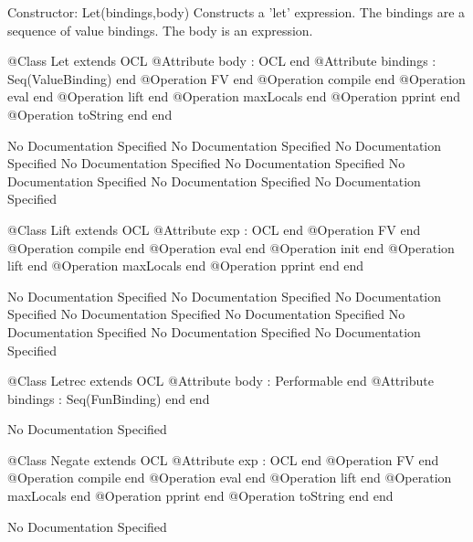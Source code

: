       Constructor: Let(bindings,body)
        Constructs a 'let' expression. The bindings are a sequence of value bindings.
        The body is an expression.
\begin{Interface}
@Class Let extends OCL
  @Attribute body : OCL end
  @Attribute bindings : Seq(ValueBinding) end
  @Operation FV end
  @Operation compile end
  @Operation eval end
  @Operation lift end
  @Operation maxLocals end
  @Operation pprint end
  @Operation toString end
end
\end{Interface}
No Documentation Specified
No Documentation Specified
No Documentation Specified
No Documentation Specified
No Documentation Specified
No Documentation Specified
No Documentation Specified
No Documentation Specified
\begin{Interface}
@Class Lift extends OCL
  @Attribute exp : OCL end
  @Operation FV end
  @Operation compile end
  @Operation eval end
  @Operation init end
  @Operation lift end
  @Operation maxLocals end
  @Operation pprint end
end
\end{Interface}
No Documentation Specified
No Documentation Specified
No Documentation Specified
No Documentation Specified
No Documentation Specified
No Documentation Specified
No Documentation Specified
No Documentation Specified
\begin{Interface}
@Class Letrec extends OCL
  @Attribute body : Performable end
  @Attribute bindings : Seq(FunBinding) end
end
\end{Interface}
No Documentation Specified
\begin{Interface}
@Class Negate extends OCL
  @Attribute exp : OCL end
  @Operation FV end
  @Operation compile end
  @Operation eval end
  @Operation lift end
  @Operation maxLocals end
  @Operation pprint end
  @Operation toString end
end
\end{Interface}
No Documentation Specified
